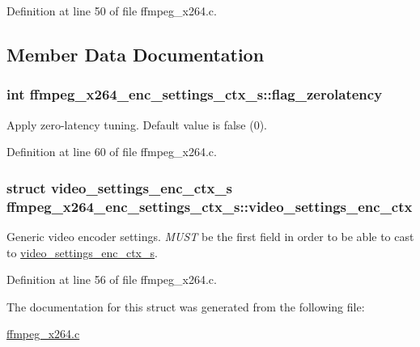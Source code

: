 Definition at line 50 of file ffmpeg\+\_\+x264.\+c.



\subsection{Member Data Documentation}
\subsubsection[{\texorpdfstring{flag\+\_\+zerolatency}{flag_zerolatency}}]{\setlength{\rightskip}{0pt plus 5cm}int ffmpeg\+\_\+x264\+\_\+enc\+\_\+settings\+\_\+ctx\+\_\+s\+::flag\+\_\+zerolatency}\hypertarget{structffmpeg__x264__enc__settings__ctx__s_a5d8b83ae84f8419809222aed45fab94f}{}\label{structffmpeg__x264__enc__settings__ctx__s_a5d8b83ae84f8419809222aed45fab94f}
Apply zero-\/latency tuning. Default value is \textquotesingle{}false\textquotesingle{} (0). 

Definition at line 60 of file ffmpeg\+\_\+x264.\+c.

\subsubsection[{\texorpdfstring{video\+\_\+settings\+\_\+enc\+\_\+ctx}{video_settings_enc_ctx}}]{\setlength{\rightskip}{0pt plus 5cm}struct {\bf video\+\_\+settings\+\_\+enc\+\_\+ctx\+\_\+s} ffmpeg\+\_\+x264\+\_\+enc\+\_\+settings\+\_\+ctx\+\_\+s\+::video\+\_\+settings\+\_\+enc\+\_\+ctx}\hypertarget{structffmpeg__x264__enc__settings__ctx__s_a9175e821e0966bbd4264fc7610460571}{}\label{structffmpeg__x264__enc__settings__ctx__s_a9175e821e0966bbd4264fc7610460571}
Generic video encoder settings. {\itshape M\+U\+ST} be the first field in order to be able to cast to \hyperlink{structvideo__settings__enc__ctx__s}{video\+\_\+settings\+\_\+enc\+\_\+ctx\+\_\+s}. 

Definition at line 56 of file ffmpeg\+\_\+x264.\+c.



The documentation for this struct was generated from the following file\+:\begin{DoxyCompactItemize}
\item 
\hyperlink{ffmpeg__x264_8c}{ffmpeg\+\_\+x264.\+c}\end{DoxyCompactItemize}
